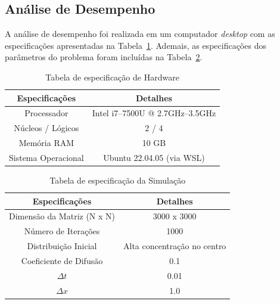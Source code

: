 \documentclass[12pt]{article}
\begin{document}
\subsection{Análise de Desempenho}

A análise de desempenho foi realizada em um computador \textit{desktop} com as
especificações apresentadas na Tabela~\ref{tab:especificacaoHardware}. Ademais,
as especificações dos parâmetros do problema foram incluídas na
Tabela~\ref{tab:especificacaoSimulacao}.

\begin{table}[ht]
  \centering
  \caption{Tabela de especificação de Hardware}
  \vspace{0.3cm}
  \begin{tabular}{||c c||}
    \hline
    Especificações      & Detalhes                         \\ [0.5ex]
    \hline\hline
    Processador         & Intel i7--7500U @ 2.7GHz--3.5GHz \\
    \hline
    Núcleos / Lógicos   & 2 / 4                            \\
    \hline
    Memória RAM         & 10 GB                            \\
    \hline
    Sistema Operacional & Ubuntu 22.04.05 (via WSL)        \\
    \hline
  \end{tabular}\label{tab:especificacaoHardware}
\end{table}

\begin{table}[ht]
  \centering
  \caption{Tabela de especificação da Simulação}
  \vspace{0.3cm}
  \begin{tabular}{||c c||}
    \hline
    Especificações             & Detalhes                    \\ [0.5ex]
    \hline\hline
    Dimensão da Matriz (N x N) & 3000 x 3000                 \\
    \hline
    Número de Iterações        & 1000                        \\
    \hline
    Distribuição Inicial       & Alta concentração no centro \\
    \hline
    Coeficiente de Difusão     & 0.1                         \\
    \hline
    $\Delta t$                 & 0.01                        \\
    \hline
    $\Delta x$                 & 1.0                         \\
    \hline
  \end{tabular}\label{tab:especificacaoSimulacao}
\end{table}
\end{document}
